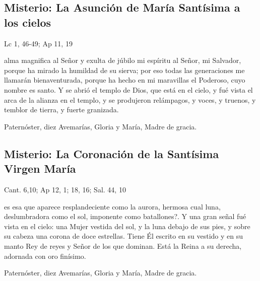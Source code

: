 \documentclass[10pt,a4paper,oneside]{book}
\newcounter{glorious-counter}
\begin{document}
\subsection*{ Misterio: La Asunción de María Santísima a los cielos}
\begin{flushright}
      {\color{red}Lc 1, 46-49; Ap 11, 19}
\end{flushright}
 alma magnifica al Señor y exulta de júbilo mi espíritu al Señor, mi Salvador, porque ha mirado la humildad de su sierva;
por eso todas las generaciones me llamarán bienaventurada, porque ha hecho en mi maravillas el Poderoso, cuyo nombre es santo. Y se abrió el templo de Dios, que está en el cielo,
y fué vista el arca de la alianza en el templo, y se produjeron relámpagos, y voces, y truenos, y temblor de tierra, y fuerte granizada.

\begin{center}
      Paternóster, diez Avemarías, Gloria y María, Madre de gracia.
\end{center}

\subsection*{ Misterio: La Coronación de la Santísima Virgen María}
\begin{flushright}
      {\color{red}Cant. 6,10; Ap 12, 1; 18, 16; Sal. 44, 10}
\end{flushright}
 es esa que aparece resplandeciente como la aurora, hermosa cual luna, deslumbradora como el sol, imponente como batallones?.
Y una gran señal fué vista en el cielo: una Mujer vestida del sol, y la luna debajo de sus  pies, y sobre su cabeza una corona de doce estrellas.
Tiene Él escrito en su vestido y en su manto Rey de reyes y Señor de los que dominan. Está la Reina a su derecha, adornada con oro finísimo.

\begin{center}
      Paternóster, diez Avemarías, Gloria y María, Madre de gracia.
\end{center}
\label{final-prayer}
\begin{center}
\end{center}
\end{document}
